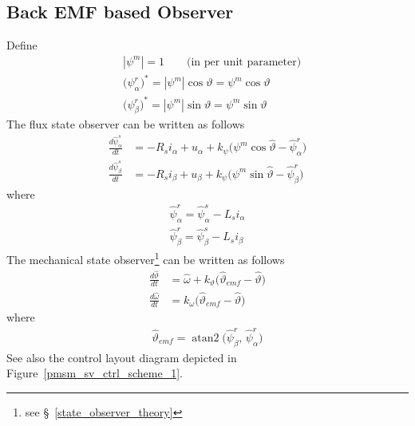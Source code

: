 \documentclass[11pt,a4paper,oneside]{book}
\numberwithin{equation}{section}
\DeclareMathOperator{\atantwo}{atan2}
\newcommand{\abs}[1]{\left|#1\right|}
\theoremstyle{it}
\theoremstyle{definition}
\begin{document}
\subsection{Back EMF based Observer}
Define
\begin{align}
	&\abs{\psi^m} = 1\qquad\text{(in per unit parameter)} \label{emf_state_obse_eq1} \\[6pt]
	&\Big(\psi_{\alpha}^r\Big)^* = \abs{\psi^m}\cos\vartheta = \psi^m\cos\vartheta \label{emf_state_obse_eq2} \\[6pt]
	&\Big(\psi_{\beta}^r\Big)^* = \abs{\psi^m}\sin\vartheta = \psi^m\sin\vartheta \label{emf_state_obse_eq3}
\end{align}
The flux state observer can be written as follows
\begin{align}
	\frac{d\hat{\psi}_{\alpha}^s}{dt} &= -R_s i_{\alpha} + u_{\alpha} + k_\psi \Big(\psi^m\cos\hat{\vartheta}-\hat{\psi}_{\alpha}^r\Big) \label{emf_state_obse_eq4} \\[6pt]
	\frac{d\hat{\psi}_{\beta}^s}{dt} &= -R_s i_{\beta} + u_{\beta} + k_\psi \Big(\psi^m\sin\hat{\vartheta}-\hat{\psi}_{\beta}^r\Big) \label{emf_state_obse_eq5}
\end{align}
where
\begin{align}
	\hat{\psi}_{\alpha}^r = \hat{\psi}_{\alpha}^s -L_s i_{\alpha} \label{emf_state_obse_eq6} \\[6pt]
	\hat{\psi}_{\beta}^r = \hat{\psi}_{\beta}^s -L_s i_{\beta} \label{emf_state_obse_eq7}
\end{align}
The mechanical state observer\footnote{see \S~\ref{state_observer_theory}} can be written as follows
\begin{align}
	\frac{d\hat{\vartheta}}{dt} &= \hat{\omega} + k_{\vartheta}\Big(\hat{\vartheta}_{emf} - \hat{\vartheta}\Big) \label{emf_state_obse_eq8} \\[6pt]
	\frac{d\hat{\omega}}{dt} &= k_{\omega}\Big(\hat{\vartheta}_{emf} - \hat{\vartheta}\Big) \label{emf_state_obse_eq9}
\end{align}
where 
\begin{align}
	\hat{\vartheta}_{emf} = \atantwo\big(\hat{\psi}_{\beta}^r,\,\hat{\psi}_{\alpha}^r\big) \label{emf_state_obse_eq10}
\end{align}
See also the control layout diagram depicted in Figure~\ref{pmsm_sv_ctrl_scheme_1}.
\end{document}
